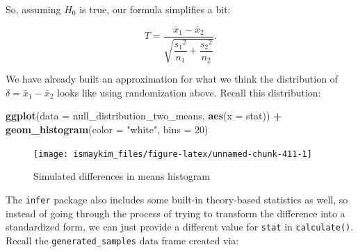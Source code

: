 \documentclass[12pt,]{krantz}
\makeatletter
\newenvironment{Shaded}{\begin{snugshade}}{\end{snugshade}}
\newcommand{\KeywordTok}[1]{\textcolor[rgb]{0.27,0.27,0.27}{\textbf{#1}}}
\newcommand{\DataTypeTok}[1]{\textcolor[rgb]{0.27,0.27,0.27}{#1}}
\newcommand{\DecValTok}[1]{\textcolor[rgb]{0.06,0.06,0.06}{#1}}
\newcommand{\StringTok}[1]{\textcolor[rgb]{0.5,0.5,0.5}{#1}}
\newcommand{\OperatorTok}[1]{\textcolor[rgb]{0.43,0.43,0.43}{\textbf{#1}}}
\newcommand{\NormalTok}[1]{#1}
\newenvironment{kframe}{%
\medskip{}
\setlength{\fboxsep}{.8em}
 \def\at@end@of@kframe{}%
 \ifinner\ifhmode%
  \def\at@end@of@kframe{\end{minipage}}%
  \begin{minipage}{\columnwidth}%
 \fi\fi%
 \def\FrameCommand##1{\hskip\@totalleftmargin \hskip-\fboxsep
 \colorbox{shadecolor}{##1}\hskip-\fboxsep
     \hskip-\linewidth \hskip-\@totalleftmargin \hskip\columnwidth}%
 \MakeFramed {\advance\hsize-\width
   \@totalleftmargin\z@ \linewidth\hsize
   \@setminipage}}%
 {\par\unskip\endMakeFramed%
 \at@end@of@kframe}
\renewenvironment{Shaded}{\begin{kframe}}{\end{kframe}}
\makeatother
\begin{document}
So, assuming \(H_0\) is true, our formula simplifies a bit:

\[T =\dfrac{ \bar{x}_1 - \bar{x}_2}{ \sqrt{\dfrac{{s_1}^2}{n_1} + \dfrac{{s_2}^2}{n_2}}  }.\]

We have already built an approximation for what we think the
distribution of \(\delta = \bar{x}_1 - \bar{x}_2\) looks like using
randomization above. Recall this distribution:

\begin{Shaded}
\begin{Highlighting}[]
\KeywordTok{ggplot}\NormalTok{(}\DataTypeTok{data =}\NormalTok{ null_distribution_two_means, }\KeywordTok{aes}\NormalTok{(}\DataTypeTok{x =}\NormalTok{ stat)) }\OperatorTok{+}
\StringTok{  }\KeywordTok{geom_histogram}\NormalTok{(}\DataTypeTok{color =} \StringTok{"white"}\NormalTok{, }\DataTypeTok{bins =} \DecValTok{20}\NormalTok{)}
\end{Highlighting}
\end{Shaded}

\begin{figure}

{\centering \texttt{[image: ismaykim\_files/figure-latex/unnamed-chunk-411-1]} 

}

\caption{Simulated differences in means histogram}\label{fig:unnamed-chunk-411}
\end{figure}

The \texttt{infer} package also includes some built-in theory-based
statistics as well, so instead of going through the process of trying to
transform the difference into a standardized form, we can just provide a
different value for \texttt{stat} in \texttt{calculate()}. Recall the
\texttt{generated\_samples} data frame created via:

\begin{Shaded}
\end{Shaded}
\end{document}
